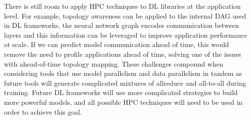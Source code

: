 There is still room to apply \gls{HPC} techniques to \gls{DL} libraries at the application level.
For example, topology awareness can be applied to the internal \gls{DAG} used in \gls{DL} frameworks, the neural network graph encodes communication between layers and this information can be leveraged to improve application performance at scale.
If we can predict model communication ahead of time, this would remove the need to profile applications ahead of time, solving one of the issues with ahead-of-time topology mapping.
These challenges compound when considering tools that use model parallelism and data parallelism in tandem as future tools will generate complicated mixtures of allreduce and all-to-all during training.
Future \gls{DL} frameworks will use more complicated strategies to build more powerful models, and all possible \gls{HPC} techniques will need to be used in order to achieve this goal.
